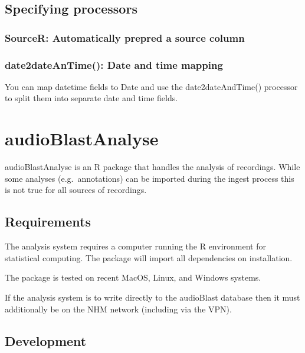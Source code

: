 \documentclass[
]{book}
\begin{document}
\hypertarget{specifying-processors}{%
\section{Specifying processors}\label{specifying-processors}}

\hypertarget{sourcer-automatically-prepred-a-source-column}{%
\subsection{SourceR: Automatically prepred a source column}\label{sourcer-automatically-prepred-a-source-column}}

\hypertarget{date2dateantime-date-and-time-mapping}{%
\subsection{date2dateAnTime(): Date and time mapping}\label{date2dateantime-date-and-time-mapping}}

You can map datetime fields to Date and use the date2dateAndTime() processor to split them into separate date and time fields.

\hypertarget{audioblastanalyse}{%
\chapter{audioBlastAnalyse}\label{audioblastanalyse}}

audioBlastAnalyse is an R package that handles the analysis of recordings. While some analyses (e.g.~annotations) can be imported during the ingest process this is not true for all sources of recordings.

\hypertarget{requirements}{%
\section{Requirements}\label{requirements}}

The analysis system requires a computer running the R environment for statistical computing. The package will import all dependencies on installation.

The package is tested on recent MacOS, Linux, and Windows systems.

If the analysis system is to write directly to the audioBlast database then it must additionally be on the NHM network (including via the VPN).

\hypertarget{development}{%
\section{Development}\label{development}}
\end{document}
